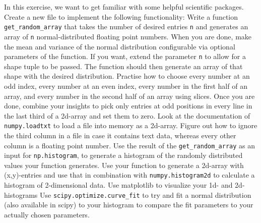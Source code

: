 \documentclass[]{erlangen-problemset}
\begin{document}
\begin{problem}[title={Using numpy and scipy for scientific calculation}]
In this exercise, we want to get familiar with some helpful scientific packages.
Create a new file to implement the following functionality:
\noindent
\Question Write a function \texttt{get\_random\_array} that takes the number of desired entries \texttt{n} and generates an array of  \texttt{n} normal-distributed floating point numbers. When you are done, make the mean and variance of the normal distribution configurable via optional parameters of the function. If you want, extend the parameter  \texttt{n} to allow for a shape tuple to be passed. The function should then generate an array of that shape with the desired distribution.
\Question Practise how to choose every number at an odd index, every number at an even index, every number in the first half of an array, and every number in the second half of an array using slices.
Once you are done, combine your insights to pick only entries at odd positions in every line in the last third of a 2d-array and set them to zero.
\Question Look at the documentation of  \texttt{numpy.loadtxt} to load a file into memory as a 2d-array. Figure out how to ignore the third column in a file in case it contains text data, whereas every other column is a floating point number.
\Question Use the result of the  \texttt{get\_random\_array} as an input for \texttt{np.histogram}, to generate a histogram of the randomly distributed values your function generates. Use your function to generate a 2d-array with (x,y)-entries and use that in combination with  \texttt{numpy.histogram2d} to calculate a histogram of 2-dimensional data.
\Question Use matplotlib to visualize your 1d- and 2d-histograms
\Question Use  \texttt{scipy.optimize.curve_fit} to try and fit a normal distribution (also available in scipy) to your histogram to compare the fit parameters to your actually chosen parameters.
\end{problem}
\end{document}
